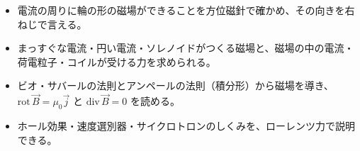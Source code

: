\newcommand\sxgout[2]{\begin{scope}[shift={#1}]\draw[bkInk, line width=0.7pt, fill=white] (0,0) circle (#2); \fill[bkInk] (0,0) circle ({0.32*#2});\end{scope}}
\newcommand\sxgin[2]{\begin{scope}[shift={#1}]\draw[bkInk, line width=0.7pt, fill=white] (0,0) circle (#2); \draw[bkInk, line width=0.7pt] (45:#2) -- (225:#2) (135:#2) -- (315:#2);\end{scope}}
\newcommand\sxgmagnet[3]{\begin{scope}[shift={#1}]
  \filldraw[fill=bkRed!55, draw=bkInk, line width=0.6pt] (0,{-#3/2}) rectangle ({#2/2},{#3/2});
  \filldraw[fill=bkBlue!40, draw=bkInk, line width=0.6pt] ({-#2/2},{-#3/2}) rectangle (0,{#3/2});
  \node[font=\sffamily\bfseries\footnotesize] at ({#2/4},0) {N};
  \node[font=\sffamily\bfseries\footnotesize] at ({-#2/4},0) {S};\end{scope}}
\newcommand\sxgcell[1]{\begin{scope}[shift={#1}]
  \filldraw[fill=bkGreen!35, draw=bkInk, line width=0.6pt, rounded corners=0.6mm] (0,0) rectangle (14,6);
  \filldraw[fill=bkGray!40, draw=bkInk, line width=0.5pt] (14,1.8) rectangle (15.4,4.2);
  \node[font=\sffamily\footnotesize] at (11.6,3) {＋};\node[font=\sffamily\footnotesize] at (2.4,3) {－};\end{scope}}
\makeatother


\begin{goal}
\begin{itemize}[label={\color{bkTheme}●}, leftmargin=1.6\zw, itemsep=0pt, topsep=1pt]
\item {}\enspace 電流の周りに輪の形の磁場ができることを方位磁針で確かめ、その向きを右ねじで言える。
\item {}\enspace まっすぐな電流・円い電流・ソレノイドがつくる磁場と、磁場の中の電流・荷電粒子・コイルが受ける力を求められる。
\item {}\enspace ビオ・サバールの法則とアンペールの法則（積分形）から磁場を導き、$\mathrm{rot}\,\vec B=\mu_0\vec j$ と $\mathrm{div}\,\vec B=0$ を読める。
\item {}\enspace ホール効果・速度選別器・サイクロトロンのしくみを、ローレンツ力で説明できる。
\end{itemize}
\end{goal}

